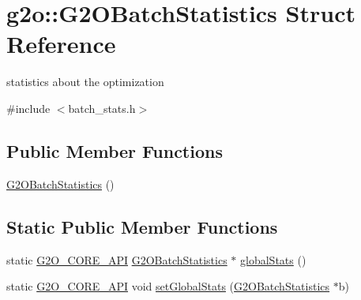 \hypertarget{structg2o_1_1_g2_o_batch_statistics}{}\section{g2o\+:\+:G2\+O\+Batch\+Statistics Struct Reference}
\label{structg2o_1_1_g2_o_batch_statistics}


statistics about the optimization  




{\ttfamily \#include $<$batch\+\_\+stats.\+h$>$}

\subsection*{Public Member Functions}
\begin{DoxyCompactItemize}
\item 
\mbox{\hyperlink{structg2o_1_1_g2_o_batch_statistics_a99b348cf1d6a913ab6683c44b36a8c55}{G2\+O\+Batch\+Statistics}} ()
\end{DoxyCompactItemize}
\subsection*{Static Public Member Functions}
\begin{DoxyCompactItemize}
\item 
static \mbox{\hyperlink{g2o__core__api_8h_a7a8d7648d6f1e26632566f335751d064}{G2\+O\+\_\+\+C\+O\+R\+E\+\_\+\+A\+PI}} \mbox{\hyperlink{structg2o_1_1_g2_o_batch_statistics}{G2\+O\+Batch\+Statistics}} $\ast$ \mbox{\hyperlink{structg2o_1_1_g2_o_batch_statistics_a85d57b829bde666635a26d52e17f20b5}{global\+Stats}} ()
\item 
static \mbox{\hyperlink{g2o__core__api_8h_a7a8d7648d6f1e26632566f335751d064}{G2\+O\+\_\+\+C\+O\+R\+E\+\_\+\+A\+PI}} void \mbox{\hyperlink{structg2o_1_1_g2_o_batch_statistics_a8c56e85d25e346ba87718621407247fc}{set\+Global\+Stats}} (\mbox{\hyperlink{structg2o_1_1_g2_o_batch_statistics}{G2\+O\+Batch\+Statistics}} $\ast$b)
\end{DoxyCompactItemize}
